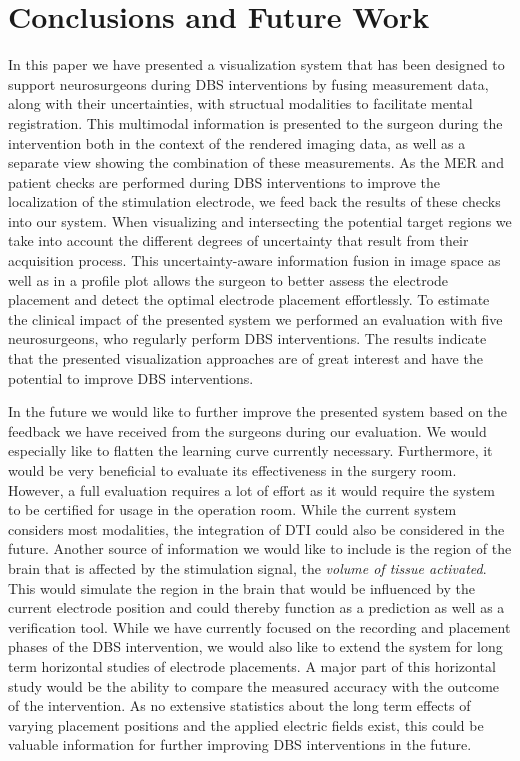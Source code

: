 \documentclass[review]{vgtc}                 %
\begin{document}
\section{Conclusions and Future Work}\label{sec:conclusions}
In this paper we have presented a visualization system that has been designed to support neurosurgeons during DBS interventions by fusing measurement data, along with their uncertainties, with structual modalities to facilitate mental registration. This multimodal information is presented to the surgeon during the intervention both in the context of the rendered imaging data, as well as a separate view showing the combination of these measurements. As the MER and patient checks are performed during DBS interventions to improve the localization of the stimulation electrode, we feed back the results of these checks into our system. When visualizing and intersecting the potential target regions we take into account the different degrees of uncertainty that result from their acquisition process. This uncertainty-aware information fusion in image space as well as in a profile plot allows the surgeon to better assess the electrode placement and detect the optimal electrode placement effortlessly. To estimate the clinical impact of the presented system we performed an evaluation with five neurosurgeons, who regularly perform DBS interventions. The results indicate that the presented visualization approaches are of great interest and have the potential to improve DBS interventions.

In the future we would like to further improve the presented system based on the feedback we have received from the surgeons during our evaluation. We would especially like to flatten the learning curve currently necessary. Furthermore, it would be very beneficial to evaluate its effectiveness in the surgery room. However, a full evaluation requires a lot of effort as it would require the system to be certified for usage in the operation room. While the current system considers most modalities, the integration of DTI could also be considered in the future. Another source of information we would like to include is the region of the brain that is affected by the stimulation signal, the \emph{volume of tissue activated}. This would simulate the region in the brain that would be influenced by the current electrode position and could thereby function as a prediction as well as a verification tool. While we have currently focused on the recording and placement phases of the DBS intervention, we would also like to extend the system for long term horizontal studies of electrode placements. A major part of this horizontal study would be the ability to compare the measured accuracy with the outcome of the intervention. As no extensive statistics about the long term effects of varying placement positions and the applied electric fields exist, this could be valuable information for further improving DBS interventions in the future.
\end{document}
